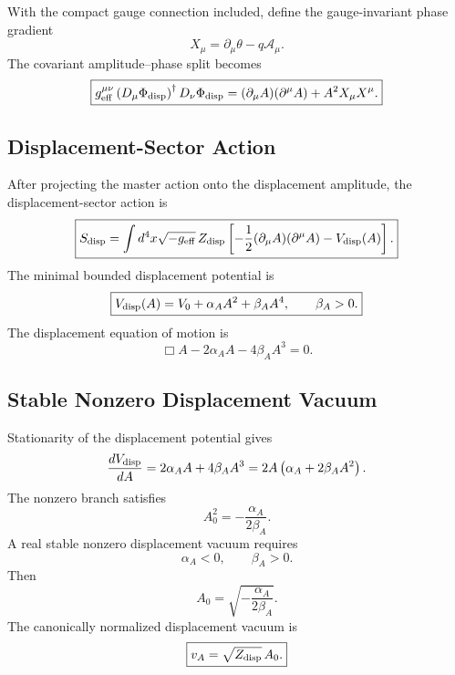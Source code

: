 \documentclass[11pt]{article}
\begin{document}
With the compact gauge connection included, define the gauge-invariant phase
gradient
\begin{equation}
\boxed{
X_\mu
=
\partial_\mu\theta-q\mathcal A_\mu.
}
\end{equation}
The covariant amplitude--phase split becomes
\begin{equation}
\boxed{
g_{\rm eff}^{\mu\nu}
\left(D_\mu\Phi_{\rm disp}\right)^\dagger
D_\nu\Phi_{\rm disp}
=
(\partial_\mu A)(\partial^\mu A)
+
A^2X_\mu X^\mu .
}
\end{equation}

\subsection{Displacement-Sector Action}

After projecting the master action onto the displacement amplitude, the
displacement-sector action is
\begin{equation}
\boxed{
S_{\rm disp}
=
\int d^4x\sqrt{-g_{\rm eff}}\,
Z_{\rm disp}
\left[
-\frac12
(\partial_\mu A)(\partial^\mu A)
-
V_{\rm disp}(A)
\right].
}
\end{equation}
The minimal bounded displacement potential is
\begin{equation}
\boxed{
V_{\rm disp}(A)
=
V_0+\alpha_AA^2+\beta_AA^4,
\qquad
\beta_A>0.
}
\end{equation}
The displacement equation of motion is
\begin{equation}
\boxed{
\Box A
-
2\alpha_AA
-
4\beta_AA^3
=
0.
}
\end{equation}

\subsection{Stable Nonzero Displacement Vacuum}

Stationarity of the displacement potential gives
\begin{equation}
\frac{dV_{\rm disp}}{dA}
=
2\alpha_AA+4\beta_AA^3
=
2A
\left(
\alpha_A+2\beta_AA^2
\right).
\end{equation}
The nonzero branch satisfies
\begin{equation}
\boxed{
A_0^2
=
-\frac{\alpha_A}{2\beta_A}.
}
\end{equation}
A real stable nonzero displacement vacuum requires
\begin{equation}
\boxed{
\alpha_A<0,
\qquad
\beta_A>0.
}
\end{equation}
Then
\begin{equation}
\boxed{
A_0
=
\sqrt{
-\frac{\alpha_A}{2\beta_A}
}.
}
\end{equation}
The canonically normalized displacement vacuum is
\begin{equation}
\boxed{
v_A
=
\sqrt{Z_{\rm disp}}\,A_0.
}
\end{equation}
\end{document}
